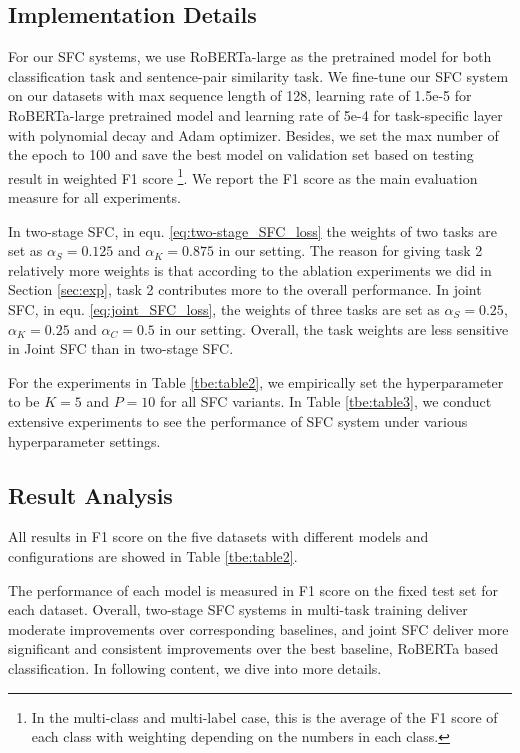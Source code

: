 \documentclass[letterpaper]{article} %
\begin{document}
  \subsection{Implementation Details}
  For  our  SFC  systems,  we  use RoBERTa-large as the pretrained model for both
  classification  task  and  sentence-pair similarity task. We fine-tune
  our  SFC  system  on  our datasets with max sequence length of 128,
  learning  rate  of 1.5e-5 for RoBERTa-large pretrained model and learning rate
  of  5e-4  for  task-specific  layer  with polynomial decay and Adam optimizer.
  Besides,  we  set  the  max number of the epoch to 100 and save the best model on
  validation  set based on testing result in weighted F1 score
  \footnote{In the multi-class and multi-label case, this is the average of the
  F1 score of each class with weighting depending on the numbers in each class.}.
  We report the F1 score as the main evaluation measure for all experiments.

  In two-stage SFC, in equ. \ref{eq:two-stage_SFC_loss} the weights of two tasks
  are  set  as  $\alpha_S=0.125$ and $\alpha_K=0.875$ in our setting. The reason
  for  giving  task  2 relatively more weights is that according to the ablation
  experiments  we  did  in Section \ref{sec:exp}, task 2 contributes more to the
  overall  performance.  In  joint  SFC,  in  equ.  \ref{eq:joint_SFC_loss}, the
  weights  of  three  tasks  are  set  as  $\alpha_S=0.25$,  $\alpha_K=0.25$ and
  $\alpha_C=0.5$  in  our setting. Overall, the task weights are less sensitive
  in Joint SFC than in two-stage SFC.

  For  the  experiments  in  Table  \ref{tbe:table2},  we  empirically  set  the
  hyperparameter  to  be  $K=5$  and  $P=10$  for  all  SFC  variants.  In Table
  \ref{tbe:table3},  we  conduct extensive experiments to see the performance of
  SFC system under various hyperparameter settings.

  \subsection{Result Analysis}
  All  results  in  F1  score  on  the  five  datasets with different models and
  configurations are showed in Table \ref{tbe:table2}.

  The performance of each model is measured in F1 score on the fixed
  test  set  for  each  dataset.  
  Overall,  two-stage  SFC systems in multi-task training deliver  moderate 
  improvements  over  corresponding baselines, and joint SFC deliver more
  significant and consistent improvements over the best baseline, RoBERTa based
  classification. In following content, we dive into more details.
\end{document}
